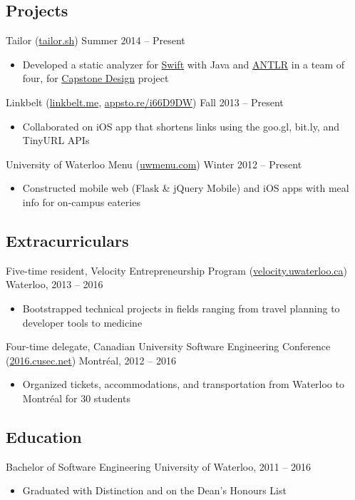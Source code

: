 \documentclass[pdftex,11pt,letterpaper]{article}
\begin{document}
\subsection*{Projects}

Tailor (\href{https://tailor.sh}{tailor.sh}) \hfill {\color{gray} Summer 2014 -- Present}
\begin{itemize}
    \item Developed a static analyzer for \href{https://developer.apple.com/swift/}{Swift} with Java and \href{http://www.antlr.org}{ANTLR} in a team of four, for \href{https://uwaterloo.ca/engineering/entrepreneurship/capstone-design/}{Capstone Design} project
\end{itemize}

Linkbelt (\href{http://linkbelt.me}{linkbelt.me}, \href{http://appsto.re/i66D9DW}{appsto.re/i66D9DW}) \hfill {\color{gray} Fall 2013 -- Present}
\begin{itemize}
  \item Collaborated on iOS app that shortens links using the goo.gl, bit.ly, and TinyURL APIs
\end{itemize}

University of Waterloo Menu (\href{http://uwmenu.com}{uwmenu.com}) \hfill {\color{gray} Winter 2012 -- Present}
\begin{itemize}
  \item Constructed mobile web (Flask \& jQuery Mobile) and iOS apps with meal info for on-campus eateries
\end{itemize}

\subsection*{Extracurriculars}

Five-time resident, Velocity Entrepreneurship Program (\href{http://velocity.uwaterloo.ca}{velocity.uwaterloo.ca}) \hfill {\color{gray} Waterloo, 2013 -- 2016}
\begin{itemize}
  \item Bootstrapped technical projects in fields ranging from travel planning to developer tools to medicine
\end{itemize}

Four-time delegate, Canadian University Software Engineering Conference (\href{http://2016.cusec.net}{2016.cusec.net}) \hfill {\color{gray} Montr\'{e}al, 2012 -- 2016}
\begin{itemize}
  \item Organized tickets, accommodations, and transportation from Waterloo to Montr\'{e}al for 30 students
\end{itemize}

\subsection*{Education}

Bachelor of Software Engineering \hfill {\color{gray} University of Waterloo, 2011 -- 2016}
\begin{itemize}
  \item Graduated with Distinction and on the Dean's Honours List
\end{itemize}
\end{document}
